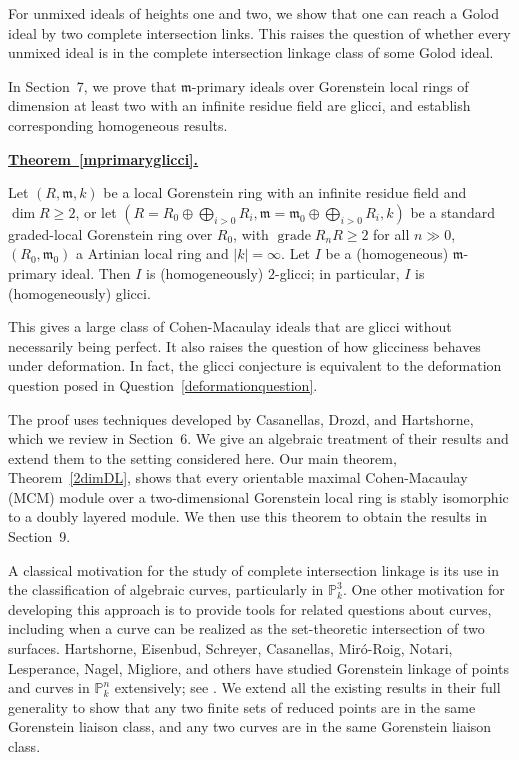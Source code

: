 \documentclass[11pt,letterpaper]{amsart}
\DeclareMathOperator{\gr}{grade}
\theoremstyle{plain}
\theoremstyle{definition}
\theoremstyle{remark}
\newenvironment{recalledtheorem}[1]
{%
  \par\vspace{7pt}
  \noindent
  \textbf{\hyperref[#1]{Theorem~\ref*{#1}.}}
  \ \itshape
}
{%
  \par\vspace{7pt}
}
\begin{document}
For unmixed ideals of heights one and two, we show that one can reach a Golod ideal by two complete intersection links. This raises the question of whether every unmixed ideal is in the complete intersection linkage class of some Golod ideal.

In Section~7, we prove that $\mathfrak m$-primary ideals over Gorenstein local rings of dimension at least two with an infinite residue field are glicci, and establish corresponding homogeneous results.
\begin{recalledtheorem}{mprimaryglicci}
Let $(R,\mathfrak m, k)$ be a local Gorenstein ring with an infinite residue field and $\dim R\ge 2$, or let $(R=R_0\oplus\bigoplus_{i>0}R_i,\mathfrak m=\mathfrak m_0\oplus\bigoplus_{i>0} R_i,k)$ be a standard graded-local Gorenstein ring over $R_0$, with $\gr R_nR\ge 2$ for all $n\gg 0$, $(R_0,\mathfrak m_0)$ a Artinian local ring and $|k|=\infty$.  Let $I$ be a (homogeneous) $\mathfrak m$-primary ideal. Then $I$ is (homogeneously) $2$-glicci; in particular, $I$ is (homogeneously) glicci. 
    
\end{recalledtheorem}

This gives a large class of Cohen-Macaulay ideals that are glicci without
necessarily being perfect.  It also raises the question of how glicciness behaves under deformation. In fact, the glicci conjecture is equivalent to the deformation question posed in Question~\ref{deformationquestion}. 

The proof uses techniques developed by Casanellas, Drozd, and Hartshorne, which we review in Section~6. We
give an algebraic treatment of their results and extend them to the setting considered here. Our main theorem, Theorem~\ref{2dimDL}, shows that every orientable maximal Cohen-Macaulay (MCM) module over a two-dimensional Gorenstein local ring is stably isomorphic to a doubly layered module. We then use this theorem to obtain the results in Section~9. 

A classical motivation for the study of complete intersection linkage
is its use in the classification of algebraic curves, particularly in $\mathbb P^3_k$. One other motivation for developing this approach is to provide tools for related questions about curves, including
when a curve can be realized as the set-theoretic intersection of two surfaces. Hartshorne, Eisenbud, Schreyer, Casanellas, Miró-Roig, Notari, Lesperance, Nagel, Migliore, and others have studied Gorenstein linkage of points and curves in $\mathbb{P}^n_k$ extensively; see \cite{hartshorne2001some, hartshorne2001experiments, hartshorne2008codimension, eisenbud2015twenty, migliore2013glicci, miro2000gorenstein, lesperance2001gorenstein, Hartshorne2004, nagel2000even, notari2006even, hartshorne2008liaison}. We extend all the existing results in their full generality to show that any two finite sets of reduced points are in the same Gorenstein liaison class, and any two curves are in the same Gorenstein liaison class.  
\end{document}
